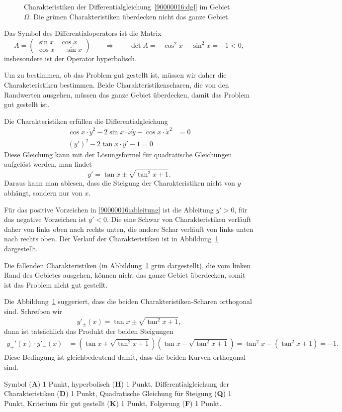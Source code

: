 \begin{loesung}
\begin{figure}
\centering
{}
\caption{Charakteristiken der Differentialgleichung~\eqref{90000016:dgl}
im Gebiet $\Omega$.
Die grünen Charakteristiken überdecken nicht das ganze Gebiet.
\label{90000016:char}}
\end{figure}
Das Symbol des Differentialoperators  ist die Matrix
\[
A
=
\begin{pmatrix} \sin x & \cos x\\ \cos x & -\sin x \end{pmatrix}
\qquad\Rightarrow\qquad
\det A
=
-\cos^2 x -\sin^2 x = -1 < 0,
\]
insbesondere ist der Operator hyperbolisch.

Um zu bestimmen, ob das Problem gut gestellt ist, müssen wir daher die
Charaketeristiken bestimmen.
Beide Charakteristikenscharen, die von den Randwerten ausgehen, müssen das
ganze Gebiet überdecken, damit das Problem gut gestellt ist.

Die Charakteristiken erfüllen die Differentialgleichung
\begin{align*}
\cos x \cdot \dot y^2
-
2\sin x\cdot \dot x \dot y
-
\cos x \cdot \dot x^2
&=
0
\\
(y')^2
-2\tan x\cdot y'
-1
=
0
\end{align*}
Diese Gleichung kann mit der Lösungsformel für quadratische Gleichungen
aufgelöst werden, man findet
\begin{equation}
y' = \tan x\pm \sqrt{\tan^2 x+1}.
\label{90000016:ableitung}
\end{equation}
Daraus kann man ablesen, dass die Steigung der Charakteristiken nicht von
$y$ abhängt, sondern nur von $x$.

Für das positive Vorzeichen in \eqref{90000016:ableitung} ist die
Ableitung $y' > 0$, für das negative Vorzeichen ist $y'<0$.
Die eine Schwar von Charakteristiken verläuft daher von links oben
nach rechts unten, die andere Schar verläuft von links unten nach
rechts oben.
Der Verlauf der Charakteristiken ist in Abbildung~\ref{90000016:char}
dargestellt.

Die fallenden Charakteristiken (in Abbildung~\ref{90000016:char} grün
dargestellt), die vom linken Rand des Gebietes
ausgehen, können nicht das ganze Gebiet überdecken, somit ist das
Problem nicht gut gestellt.
\end{loesung}

\begin{diskussion}
Die Abbildung~\ref{90000016:char} suggeriert, dass die beiden
Charakteristiken-Scharen orthogonal sind.
Schreiben wir
\[
y'_\pm(x)
=
\tan x\pm \sqrt{\tan^2 x+1},
\]
dann ist tatsächlich das Produkt der beiden Steigungen
\begin{align*}
y_+'(x)\cdot y'_-(x)
&=
(\tan x + \sqrt{\tan^2 x+1})
(\tan x - \sqrt{\tan^2 x+1})
=
\tan^2x - (\tan^2x+1)
=
-1.
\end{align*}
Diese Bedingung ist gleichbedeutend damit, dass die beiden Kurven
orthogonal sind.
\end{diskussion}

\begin{bewertung}
Symbol ({\bf A}) 1 Punkt,
hyperbolisch ({\bf H}) 1 Punkt,
Differentialgleichung der Charakteristiken ({\bf D}) 1 Punkt,
Quadratische Gleichung für Steigung ({\bf Q}) 1 Punkt,
Kriterium für gut gestellt ({\bf K}) 1 Punkt,
Folgerung ({\bf F}) 1 Punkt.
\end{bewertung}


